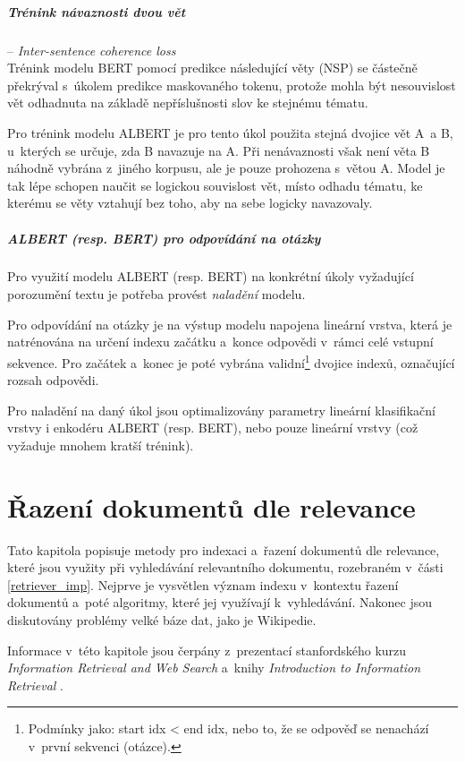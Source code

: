 \paragraph{Trénink návaznosti dvou vět} -- \textit{Inter-sentence coherence loss}\\
Trénink modelu BERT pomocí predikce následující věty (NSP) se částečně překrýval s~úkolem predikce maskovaného tokenu, protože mohla být nesouvislost vět odhadnuta na základě nepříslušnosti slov ke stejnému tématu.\par
Pro trénink modelu ALBERT je pro tento úkol použita stejná dvojice vět A~a B, u~kterých se určuje, zda B navazuje na A. Při nenávaznosti však není věta B náhodně vybrána z~jiného korpusu, ale je pouze prohozena s~větou A. Model je tak lépe schopen naučit se logickou souvislost vět, místo odhadu tématu, ke kterému se věty vztahují bez toho, aby na sebe logicky navazovaly.
\bigskip\bigskip
\paragraph{ALBERT (resp. BERT) pro odpovídání na otázky}
Pro využití modelu ALBERT (resp. BERT) na konkrétní úkoly vyžadující porozumění textu je potřeba provést \emph{naladění} modelu.\par
Pro odpovídání na otázky je na výstup modelu napojena lineární vrstva, která je natrénována na určení indexu začátku a~konce odpovědi v~rámci celé vstupní sekvence. Pro začátek a~konec je poté vybrána validní\footnote{Podmínky jako: start idx < end idx, nebo to, že se odpověď se nenachází v~první sekvenci (otázce).} dvojice indexů, označující rozsah odpovědi.\par
Pro naladění na daný úkol jsou optimalizovány parametry lineární klasifikační vrstvy i enkodéru ALBERT (resp. BERT), nebo pouze lineární vrstvy (což vyžaduje mnohem kratší trénink).


\chapter{Řazení dokumentů dle relevance}
\label{document_indexing}
Tato kapitola popisuje metody pro indexaci a~řazení dokumentů dle relevance, které jsou využity při vyhledávání relevantního dokumentu, rozebraném v~části \ref{retriever_imp}. Nejprve je vysvětlen význam indexu v~kontextu řazení dokumentů a~poté algoritmy, které jej využívají k~vyhledávání. Nakonec jsou diskutovány problémy velké báze dat, jako je Wikipedie.\par
Informace v~této kapitole jsou čerpány z~prezentací stanfordského kurzu \emph{Information Retrieval and Web Search} \cite{stanford:retrieval} a~knihy \emph{Introduction to Information Retrieval} \cite{information_retrieval}.

